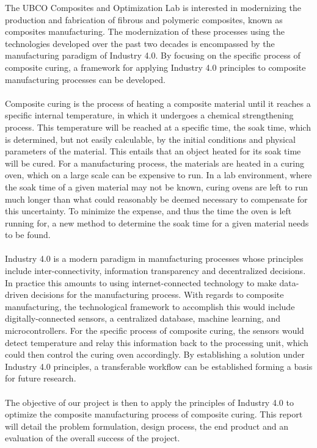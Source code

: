 The UBCO Composites and Optimization Lab is interested in modernizing the production and fabrication of fibrous and polymeric composites, known as composites manufacturing. The modernization of these processes using the technologies developed over the past two decades is encompassed by the manufacturing paradigm of Industry 4.0. By focusing on the specific process of composite curing, a framework for applying Industry 4.0 principles to composite manufacturing processes can be developed. \\\\
Composite curing is the process of heating a composite material until it reaches a specific internal temperature, in which it undergoes a chemical strengthening process. This temperature will be reached at a specific time, the soak time, which is determined, but not easily calculable, by the initial conditions and physical parameters of the material. This entails that an object heated for its soak time will be cured. For a manufacturing process, the materials are heated in a curing oven, which on a large scale can be expensive to run. In a lab environment, where the soak time of a given material may not be known, curing ovens are left to run much longer than what could reasonably be deemed necessary to compensate for this uncertainty. To minimize the expense, and thus the time the oven is left running for, a new method to determine the soak time for a given material needs to be found. \\\\
Industry 4.0 is a modern paradigm in manufacturing processes whose principles include inter-connectivity, information transparency and decentralized decisions. In practice this amounts to using internet-connected technology to make data-driven decisions for the manufacturing process. With regards to composite manufacturing, the technological framework to accomplish this would include digitally-connected sensors, a centralized database, machine learning, and microcontrollers. For the specific process of composite curing, the sensors would detect temperature and relay this information back to the processing unit, which could then control the curing oven accordingly. By establishing a solution under Industry 4.0 principles, a transferable workflow can be established forming a basis for future research. \\\\
The objective of our project is then to apply the principles of Industry 4.0 to optimize the composite manufacturing process of composite curing. This report will detail the problem formulation, design process, the end product and an evaluation of the overall success of the project. \\\\
